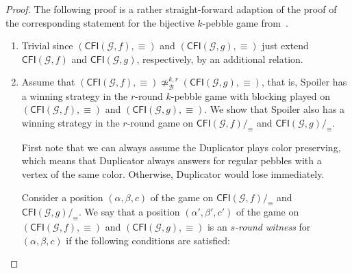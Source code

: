 \documentclass[10pt,a4paper]{article}
\newcommand{\defining}[1]{\emph{#1}}
\newcommand{\comp}{\equiv}
\newcommand{\CFIsym}{\mathsf{CFI}}
\newcommand{\CFI}[1]{\CFIsym(#1)}
\newcommand{\compCFI}[2]{\CFI{#1}/_{#2}}
\newcommand{\precompCFI}[2]{{(\CFI{#1},#2)}}
\newcommand{\graphG}{\mathcal{G}}
\newcommand{\notkbequivr}[2]{\not\simeq_{\mathcal{B}}^{#1,#2}}
\begin{document}
%
\begin{proof}
        The following proof is a rather straight-forward adaption of
        the proof of the corresponding statement for the bijective $k$-pebble game
        from~\cite{DBLP:conf/focs/GroheLNS23}.
        \begin{enumerate}
                \item Trivial since $\precompCFI{\graphG,f}{\comp}$ and  $\precompCFI{\graphG,g}{\comp}$ just extend $\CFI{\graphG,f}$ and $\CFI{\graphG,g}$, respectively, by an additional relation.
                \item 
        
         Assume that $\precompCFI{\graphG,f}{\comp} \notkbequivr{k}{r} \precompCFI{\graphG,g}{\comp}$,
        that is, Spoiler has a winning strategy in the $r$\nobreakdash-round $k$\nobreakdash-pebble game with blocking played on $\precompCFI{\graphG,f}{\comp}$ and $\precompCFI{\graphG,g}{\comp}$.
        We show that Spoiler also has a winning strategy in the $r$\nobreakdash-round game
        on $\compCFI{\graphG,f}{\comp}$ and $\compCFI{\graphG,g}{\comp}$.
        
        First note that we can always assume the Duplicator plays color preserving,
        which means that Duplicator always answers for regular pebbles
         with a vertex of the same color.
        Otherwise, Duplicator would lose immediately.
        
        
        Consider a position $(\alpha,\beta,c)$ of the game on $\compCFI{\graphG,f}{\comp}$ and $\compCFI{\graphG,g}{\comp}$.
        We say that a position $(\alpha',\beta',c')$ of the game on $\precompCFI{\graphG,f}{\comp}$ and $\precompCFI{\graphG,g}{\comp}$ is an \defining{$s$-round witness} for
        $(\alpha,\beta,c)$ if the following conditions are satisfied:
        \begin{enumerate}
        \makeatletter
        \renewcommand{\p@enumii}{}
        \renewcommand{\theenumii}{(\alph{enumii})}
\renewcommand{\labelenumii}{(\alph{enumii})}
        \setlength{\leftskip}{0.5em}
        \makeatother


\end{enumerate}
\end{enumerate}
\end{proof}
\end{document}
